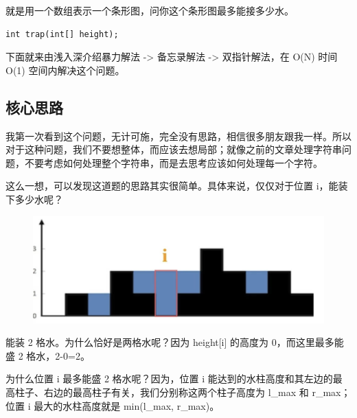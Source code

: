 \documentclass[12pt]{article}
\begin{document}
就是用一个数组表示一个条形图，问你这个条形图最多能接多少水。
\begin{lstlisting}
int trap(int[] height);
\end{lstlisting}

下面就来由浅入深介绍暴力解法 -> 备忘录解法 -> 双指针解法，在 O(N) 时间 O(1) 空间内解决这个问题。

\subsection{核心思路}
我第一次看到这个问题，无计可施，完全没有思路，相信很多朋友跟我一样。所以对于这种问题，我们不要想整体，而应该去想局部；就像之前的文章处理字符串问题，不要考虑如何处理整个字符串，而是去思考应该如何处理每一个字符。

这么一想，可以发现这道题的思路其实很简单。具体来说，仅仅对于位置 i，能装下多少水呢？
\begin{figure}[H]
    \centering
    \includegraphics[width=.6\textwidth]{fig/Receive_Rainwater_2.png}
\end{figure}

能装 2 格水。为什么恰好是两格水呢？因为 height[i] 的高度为 0，而这里最多能盛 2 格水，2-0=2。

为什么位置 i 最多能盛 2 格水呢？因为，位置 i 能达到的水柱高度和其左边的最高柱子、右边的最高柱子有关，我们分别称这两个柱子高度为 l\_max 和 r\_max；位置 i 最大的水柱高度就是 min(l\_max, r\_max)。
\end{document}
